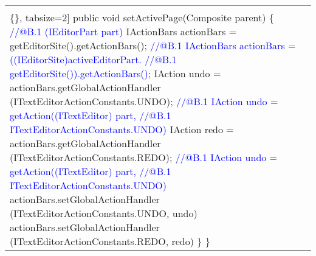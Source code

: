 \begin{figure*}[!htb]
\begin{minipage}{0.5\textwidth}
\begin{tabular}{@{}p{}}
\begin{Verbatim}[commandchars=\\\{\}, tabsize=2]
 public void setActivePage(Composite parent) \{
\textcolor{blue}{//@B.1 (IEditorPart part)}
   IActionBars actionBars = getEditorSite().getActionBars();
\textcolor{blue}{//@B.1 IActionBars actionBars = ((IEditorSite)activeEditorPart.}
\textcolor{blue}{//@B.1  getEditorSite()).getActionBars();}
   IAction undo = actionBars.getGlobalActionHandler
     (ITextEditorActionConstants.UNDO);
\textcolor{blue}{//@B.1 IAction undo = getAction((ITextEditor) part, }
\textcolor{blue}{//@B.1   ITextEditorActionConstants.UNDO)     } 
   IAction redo = actionBars.getGlobalActionHandler
     (ITextEditorActionConstants.REDO);
\textcolor{blue}{//@B.1 IAction undo = getAction((ITextEditor) part, }
\textcolor{blue}{//@B.1    ITextEditorActionConstants.UNDO)  }       
   actionBars.setGlobalActionHandler
     (ITextEditorActionConstants.UNDO, undo)
   actionBars.setGlobalActionHandler
     (ITextEditorActionConstants.REDO, redo)     
\} \}
 \end{Verbatim}
      \vspace{-4mm}
  \\      \hline
\end{tabular} 
\end{minipage}
\caption{Cluster 2, 4: more alternative features}
\label{fig:cluster24}
\end{figure*}



%






